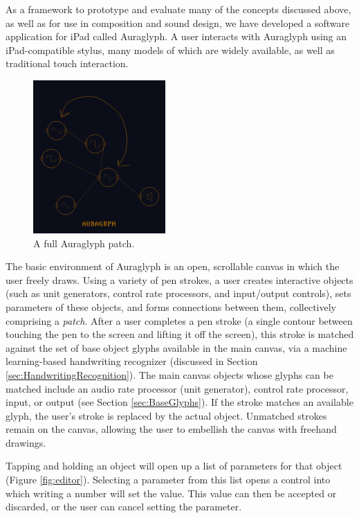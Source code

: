 \documentclass{nime-alternate}
\begin{document}
As a framework to prototype and evaluate many of the concepts discussed above, as well as for   use in composition and sound design, we have developed a software application for iPad called Auraglyph. 
A user interacts with Auraglyph using an iPad-compatible stylus, many models of which are widely available, as well as traditional touch interaction. 

\begin{figure}[h]
	\centering
		\includegraphics[width=0.45\textwidth]{figures/patch.png}
	\caption{A full Auraglyph patch.}
	\label{fig:patch}
\end{figure}

The basic environment of Auraglyph is an open, scrollable canvas in which the user freely draws. 
Using a variety of pen strokes, a user creates interactive objects (such as unit generators, control rate processors, and input/output controls), sets parameters of these objects, and forms connections between them, collectively comprising a \emph{patch}. 
After a user completes a pen stroke (a single contour between touching the pen to the screen and lifting it off the screen), this stroke is matched against the set of base object glyphs available in the main canvas, via a machine learning-based handwriting recognizer (discussed in Section \ref{sec:HandwritingRecognition}). 
The main canvas objects whose glyphs can be matched include an audio rate processor (unit generator), control rate processor, input, or output (see Section \ref{sec:BaseGlyphs}). 
If the stroke matches an available glyph, the user's stroke is replaced by the actual object. 
Unmatched strokes remain on the canvas, allowing the user to embellish the canvas with freehand drawings. 

Tapping and holding an object will open up a list of parameters for that object (Figure \ref{fig:editor}). 
Selecting a parameter from this list opens a control into which writing a number will set the value. 
This value can then be accepted or discarded, or the user can cancel setting the parameter. 
\end{document}
